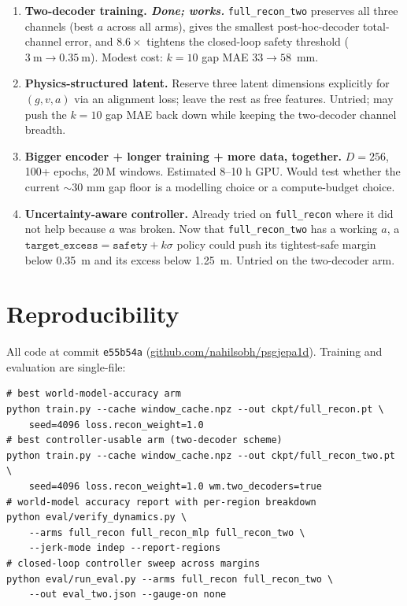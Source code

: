 \documentclass[11pt,a4paper]{article}
\begin{document}
\begin{enumerate}
\item \textbf{Two-decoder training. \emph{Done; works.}}
      \texttt{full\_recon\_two} preserves all three channels (best $a$ across
      all arms), gives the smallest post-hoc-decoder total-channel error, and
      $8.6\times$ tightens the closed-loop safety threshold ($\SI{3}{\m}
      \to \SI{0.35}{\m}$). Modest cost: $k{=}10$ gap MAE $33 \to 58$~mm.
\item \textbf{Physics-structured latent.} Reserve three latent dimensions
      explicitly for $(g, v, a)$ via an alignment loss; leave the rest as
      free features. Untried; may push the $k{=}10$ gap MAE back down while
      keeping the two-decoder channel breadth.
\item \textbf{Bigger encoder + longer training + more data, together.}
      $D{=}256$, 100+ epochs, 20\,M windows. Estimated 8--10 h GPU. Would
      test whether the current $\sim$30 mm gap floor is a modelling choice
      or a compute-budget choice.
\item \textbf{Uncertainty-aware controller.} Already tried on
      \texttt{full\_recon} where it did not help because $a$ was broken.
      Now that \texttt{full\_recon\_two} has a working $a$, a
      $\texttt{target\_excess} = \texttt{safety} + k\sigma$ policy could
      push its tightest-safe margin below \SI{0.35}{\m} and its excess below
      \SI{1.25}{\m}. Untried on the two-decoder arm.
\end{enumerate}

\section{Reproducibility}

All code at commit \texttt{e55b54a} (\href{https://github.com/nahilsobh/psgjepa1d}{github.com/nahilsobh/psgjepa1d}).
Training and evaluation are single-file:
\begin{Verbatim}[fontsize=\small]
# best world-model-accuracy arm
python train.py --cache window_cache.npz --out ckpt/full_recon.pt \
    seed=4096 loss.recon_weight=1.0
# best controller-usable arm (two-decoder scheme)
python train.py --cache window_cache.npz --out ckpt/full_recon_two.pt \
    seed=4096 loss.recon_weight=1.0 wm.two_decoders=true
# world-model accuracy report with per-region breakdown
python eval/verify_dynamics.py \
    --arms full_recon full_recon_mlp full_recon_two \
    --jerk-mode indep --report-regions
# closed-loop controller sweep across margins
python eval/run_eval.py --arms full_recon full_recon_two \
    --out eval_two.json --gauge-on none
\end{Verbatim}
\end{document}
